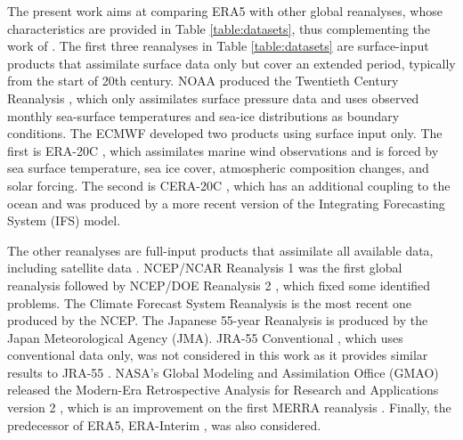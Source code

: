\documentclass[alpha-refs]{wiley-article}
\begin{document}
The present work aims at comparing ERA5 \citep{Hersbach2019} with other global reanalyses, whose characteristics are provided in Table \ref{table:datasets}, thus complementing the work of \citet{Horton2018b}. The first three reanalyses in Table \ref{table:datasets} are surface-input \citep{Fujiwara2017} products that assimilate surface data only but cover an extended period, typically from the start of 20th century. NOAA produced the Twentieth Century Reanalysis \citep[version 2c, 20CR-2c --][]{Compo2011}, which only assimilates surface pressure data and uses observed monthly sea-surface temperatures and sea-ice distributions as boundary conditions. The ECMWF developed two products using surface input only. The first is ERA-20C \citep{Poli2016}, which assimilates marine wind observations and is forced by sea surface temperature, sea ice cover, atmospheric composition changes, and solar forcing. The second is CERA-20C \citep{Laloyaux2018a}, which has an additional coupling to the ocean and was produced by a more recent version of the Integrating Forecasting System (IFS) model.

The other reanalyses are full-input products that assimilate all available data, including satellite data \citep{Fujiwara2017}. NCEP/NCAR Reanalysis 1 \citep[NR-1 --][]{Kalnay1996, Kistler2001} was the first global reanalysis followed by NCEP/DOE Reanalysis 2 \citep[NR-2 --][]{Kanamitsu2002}, which fixed some identified problems. The Climate Forecast System Reanalysis \citep[CFSR --][]{Saha2010a} is the most recent one produced by the NCEP. The Japanese 55-year Reanalysis \citep[JRA-55 --][]{Kobayashi2015, Harada2016} is produced by the Japan Meteorological Agency (JMA). JRA-55 Conventional \citep[JRA-55C --][]{Kobayashi2014}, which uses conventional data only, was not considered in this work as it provides similar results to JRA-55 \citep{Horton2018b}. NASA's Global Modeling and Assimilation Office (GMAO) released the Modern-Era Retrospective Analysis for Research and Applications version 2 \citep[MERRA-2 -- ][]{Gelaro2017}, which is an improvement on the first MERRA reanalysis \citep{Rienecker2011}. Finally, the predecessor of ERA5, ERA-Interim \citep[ERA-INT --][]{Dee2011a}, was also considered.
\end{document}
